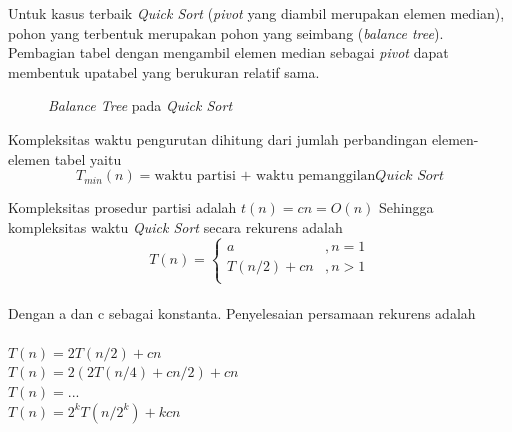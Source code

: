 \documentclass{article}
\begin{document}
	\par Untuk kasus terbaik \textit{Quick Sort} (\textit{pivot} yang diambil merupakan elemen median), pohon yang terbentuk merupakan pohon yang seimbang (\textit{balance tree}). Pembagian tabel dengan mengambil elemen median sebagai \textit{pivot} dapat membentuk upatabel yang berukuran relatif sama.
	
\begin{figure}[h]
\vspace*{-0.2in}
\caption{\textit{Balance Tree} pada \textit{Quick Sort}}
\end{figure}
	
	\clearpage

	\par Kompleksitas waktu pengurutan dihitung dari jumlah perbandingan elemen-elemen tabel yaitu
\[T_{min}(n) = \text{waktu partisi + waktu pemanggilan} \textit{Quick Sort}\]
	\par Kompleksitas prosedur partisi adalah $t(n) = cn = O(n)$ Sehingga kompleksitas waktu \textit{Quick Sort} secara rekurens adalah
\[ T(n) =
  \begin{cases}
    a & , n = 1\\
    T(n/2) + cn  & , n > 1\\
  \end{cases}
\]\\
	
	Dengan a dan c sebagai konstanta. Penyelesaian persamaan rekurens adalah\\
	$ $\\
	$T(n) = 2T(n/2) + cn$ \\
	$T(n) = 2(2T(n/4) + cn/2) + cn$\\
	$T(n) = ...$\\
	$T(n) = 2^kT(n/2^k) + kcn$\\
	
\end{document}
